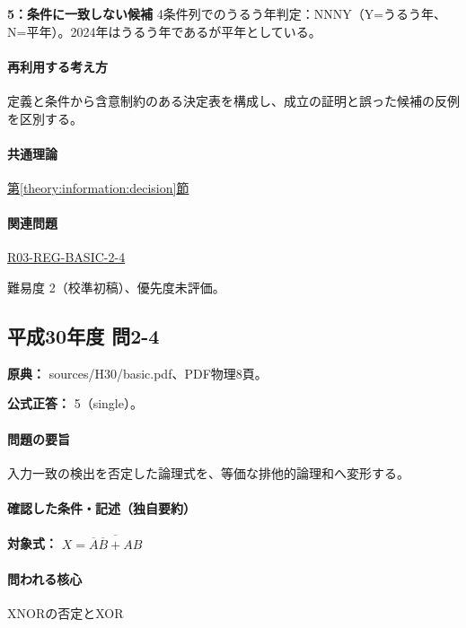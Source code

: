 \noindent\textbf{5：条件に一致しない候補} 4条件列でのうるう年判定：NNNY（Y=うるう年、N=平年）。2024年はうるう年であるが平年としている。\par

\paragraph{再利用する考え方} 定義と条件から含意制約のある決定表を構成し、成立の証明と誤った候補の反例を区別する。

\paragraph{共通理論} \hyperref[theory:information:decision]{第\ref*{theory:information:decision}節}

\paragraph{関連問題} \hyperref[q:r03-reg-basic-2-4]{R03-REG-BASIC-2-4}

\par 難易度 2（校準初稿）、優先度未評価。

\subsection{平成30年度 問2-4}
\label{q:h30-reg-basic-2-4}

\noindent\textbf{原典：} sources/H30/basic.pdf、PDF物理8頁。

\textbf{公式正答：} 5（single）。

\paragraph{問題の要旨} 入力一致の検出を否定した論理式を、等価な排他的論理和へ変形する。

\paragraph{確認した条件・記述（独自要約）}\mbox{}\par

\noindent\textbf{対象式：} \(X=\overline{\overline A\overline B+AB}\)\par

\paragraph{問われる核心} XNORの否定とXOR

